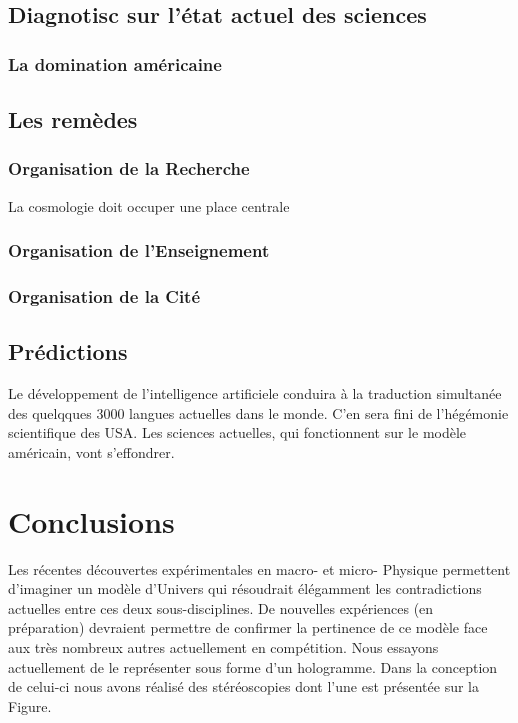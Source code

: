 \documentclass[a4paper,12pt]{article}
\begin{document}
\subsection {Diagnotisc sur l'état actuel des sciences}
\subsubsection{La domination américaine}



\subsection {Les remèdes} 
\subsubsection {Organisation de la Recherche}
La cosmologie doit occuper une place centrale
\subsubsection {Organisation de l'Enseignement}
\subsubsection {Organisation de la Cité}


\subsection {Prédictions}
Le développement de l'intelligence artificiele conduira à la traduction simultanée des quelqques 3000 langues actuelles dans le monde. C'en sera fini de l'hégémonie scientifique des USA.
Les sciences actuelles, qui fonctionnent sur le modèle américain, vont s'effondrer. 









\section{Conclusions}
\label{sec:headings}

Les récentes découvertes expérimentales en macro- et micro- Physique permettent d'imaginer un modèle d'Univers qui résoudrait élégamment les contradictions actuelles entre ces deux sous-disciplines. De nouvelles expériences (en préparation) devraient permettre de confirmer la pertinence de ce modèle face aux très nombreux autres actuellement en compétition. Nous essayons actuellement de le représenter sous forme d'un hologramme. Dans la conception de celui-ci nous avons réalisé des stéréoscopies dont l'une est présentée sur la Figure.
\end{document}
